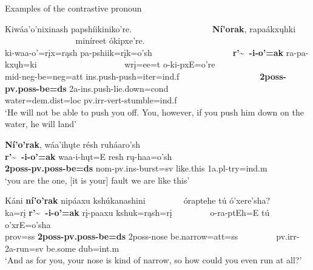 \begin{exe}

\item\label{ContrastivePronounEx} Examples of the contrastive pronoun

\begin{xlist}

\item\label{ContrastivePronounEx1} \glll Kiwáa'o'nixinash papshíikiniko're. ~ ~ ~ ~ ~ ~ ~ ~ ~ ~ ~ \textbf{Ní'orak}, rapaákxųhki ~ ~ ~ ~ ~ ~ ~ ~ ~ ~ ~ ~ miníreet ókipxe're.\\
    ki-waa-o'=rįx=rąsh pa-pshiik=rįk=o'sh ~ ~ ~ ~ ~ ~ ~ ~ ~ ~ ~ \textbf{r'\~~-i-o'=ak} ra-pa-kxųh=ki ~ ~ ~ ~ ~ ~ ~ ~ ~ ~ ~ ~ wrį=ee=t o-ki-pxE=o're\\
    mid-neg-\textnormal{be}=neg=att ins.push-\textnormal{push}=iter=ind.f ~ ~ ~ ~ ~ ~ ~ ~ ~ ~ ~ \textbf{2poss-pv.poss-\textnormal{\bfseries be}=ds} 2a-ins.push-\textnormal{lie.down}=cond ~ ~ ~ ~ ~ ~ ~ ~ ~ ~ ~ ~ \textnormal{water}=dem.dist=loc pv.irr-vert-\textnormal{stumble}=ind.f\\
    \glt `He will not be able to push you off. You, however, if you push him down on the water, he will land' \citep[105]{hollow1973a}
    
\item\label{ContrastivePronounEx2} \glll \textbf{Ní'o'rak}, wáa'ihųte résh ruháaro'sh\\
    \textbf{r'\~~-i-o'=ak} waa-i-hųt=E resh rų-haa=o'sh\\
    \textbf{2poss-pv.poss-\textnormal{\bfseries be}=ds} nom-pv.ins-\textnormal{burst}=sv \textnormal{like.this} 1a.pl-\textnormal{try}=ind.m\\
    \glt `you are the one, [it is your] fault we are like this' \citep[50]{trechter2012}
    
\item\label{ContrastivePronounEx3} \glll Káni \textbf{ní'o'rak} nipáaxu kshúkanashini ~ ~ ~ ~ ~ óraptehe tú ó'xere'sha?\\
    ka=rį \textbf{r'\~~-i-o'=ak} rį-paaxu kshuk=rąsh=rį ~ ~ ~ ~ ~  o-ra-ptEh=E tú o'xrE=o'sha\\
    \textnormal{prov}=ss \textbf{2poss-pv.poss-\textnormal{\bfseries be}=ds} 2poss-\textnormal{nose} \textnormal{be.narrow}=att=ss ~ ~ ~ ~ ~ pv.irr-2a-\textnormal{run}=sv \textnormal{be.some} dub=int.m\\
    \glt `And as for you, your nose is kind of narrow, so how could you even run at all?' \citep[59]{hollow1973b}
    

\end{xlist}
\end{exe}
